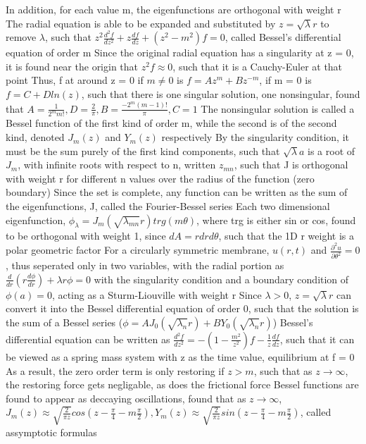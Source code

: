 \documentclass[11 pt, twoside]{article}
\newenvironment{outline*}
{
	\begin{outline}[enumerate]
	}
	{\end{outline}
}
\newcommand\pd[2]{\frac{\partial #1}{\partial #2}}
\begin{document}
\begin{outline*}
			\4 In addition, for each value m, the eigenfunctions are orthogonal with weight r
	\2 The radial equation is able to be expanded and substituted by $z = \sqrt{\lambda}r$ to remove $\lambda$, such that $z^2\frac{d^2f}{dz^2} + z\frac{df}{dz} + (z^2 - m^2)f = 0$, called Bessel's differential equation of order m
		\3 Since the original radial equation has a singularity at z = 0, it is found near the origin that $z^2f \approx 0$, such that it is a Cauchy-Euler at that point
		\3 Thus, f at around z = 0 if $m \neq 0$ is $f = Az^m + Bz^{-m}$, if m = 0 is $f = C + Dln(z)$, such that there is one singular solution, one nonsingular, found that $A = \frac{1}{2^mm!}, D = \frac{2}{\pi}, B = \frac{-2^m(m - 1)!}{\pi}, C = 1$
			\4 The nonsingular solution is called a Bessel function of the first kind of order m, while the second is of the second kind, denoted $J_m(z)$ and $Y_m(z)$ respectively
		\3 By the singularity condition, it must be the sum purely of the first kind components, such that $\sqrt{\lambda}a$ is a root of $J_m$, with infinite roots with respect to n, written $z_{mn}$, such that J is orthogonal with weight r for different n values over the radius of the function (zero boundary)
			\4 Since the set is complete, any function can be written as the sum of the eigenfunctions, J, called the Fourier-Bessel series
	\2 Each two dimensional eigenfunction, $\phi_{\lambda} = J_m(\sqrt{\lambda_{mn}}r)trg(m\theta)$, where trg is either sin or cos, found to be orthogonal with weight 1, since $dA = rdrd\theta$, such that the 1D r weight is a polar geometric factor
	\2 For a circularly symmetric membrane, $u(r, t)$ and $\pd{^2u}{\theta^2} = 0$, thus seperated only in two variables, with the radial portion as $\frac{d}{dr}(r\frac{d\phi}{dr}) + \lambda r \phi = 0$ with the singularity condition and a boundary condition of $\phi(a) = 0$, acting as a Sturm-Liouville with weight r
		\3 Since $\lambda > 0$, $z = \sqrt{\lambda}r$ can convert it into the Bessel differential equation of order 0, such that the solution is the sum of a Bessel series ($\phi = AJ_0(\sqrt{\lambda_n}r) + BY_0(\sqrt{\lambda_n}r)$)
\1 Bessel's differential equation can be written as $\frac{d^2f}{dz^2} = -(1 - \frac{m^2}{z^2})f - \frac{1}{z}\frac{df}{dz}$, such that it can be viewed as a spring mass system with z as the time value, equilibrium at f = 0
	\2 As a result, the zero order term is only restoring if $z > m$, such that as $z \to \infty$, the restoring force gets negligable, as does the frictional force
		\3 Bessel functions are found to appear as deccaying oscillations, found that as $z \to \infty$, $J_m(z) \approx \sqrt{\frac{2}{\pi z}}cos(z - \frac{\pi}{4} - m\frac{\pi}{2}), Y_m(z) \approx \sqrt{\frac{2}{\pi z}}sin(z - \frac{\pi}{4} - m\frac{\pi}{2})$, called assymptotic formulas

\end{outline*}
\end{document}
